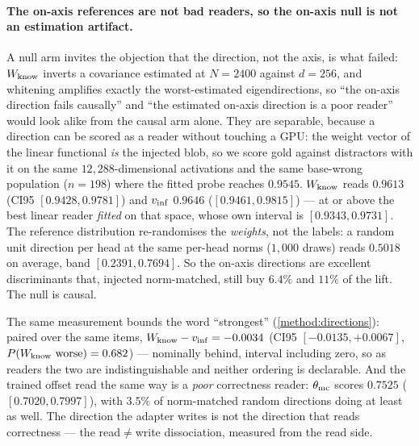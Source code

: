 \paragraph{The on-axis references are not bad readers, so the on-axis null is not an
estimation artifact.}
A null arm invites the objection that the direction, not the axis, is what failed:
$W_{\mathrm{know}}$ inverts a covariance estimated at $N{=}2400$ against $d{=}256$, and whitening
amplifies exactly the worst-estimated eigendirections, so ``the on-axis direction
fails causally'' and ``the estimated on-axis direction is a poor reader'' would look
alike from the causal arm alone. They are separable, because a direction can be
scored as a reader without touching a GPU: the weight vector of the linear functional
\emph{is} the injected blob, so we score gold against distractors with it on the same
$12{,}288$-dimensional activations and the same base-wrong population ($n{=}198$)
where the fitted probe reaches $0.9545$. $W_{\mathrm{know}}$ reads $\mathbf{0.9613}$ (CI95
$[0.9428, 0.9781]$) and $v_{\mathrm{inf}}$ $0.9646$ ($[0.9461, 0.9815]$) --- at or above the
best linear reader \emph{fitted} on that space, whose own interval is
$[0.9343, 0.9731]$. The reference distribution re-randomises the \emph{weights},
not the labels: a random unit direction per head at the same per-head norms
($1{,}000$ draws) reads $0.5018$ on average, band $[0.2391, 0.7694]$. So the on-axis
directions are excellent discriminants that, injected norm-matched, still buy
$6.4\%$ and $11\%$ of the lift. The null is causal.

The same measurement bounds the word ``strongest'' (\cref{method:directions}):
paired over the same items, $W_{\mathrm{know}} - v_{\mathrm{inf}} = -0.0034$ (CI95 $[-0.0135, +0.0067]$,
$P(W_{\mathrm{know}}\ \text{worse}) = 0.682$) --- nominally behind, interval including zero, so
as readers the two are indistinguishable and neither ordering is declarable. And the
trained offset read the same way is a \emph{poor} correctness reader: $\theta_{\mathrm{mc}}$
scores $0.7525$ ($[0.7020, 0.7997]$), with $3.5\%$ of norm-matched random directions
doing at least as well. The direction the adapter writes is not the direction that
reads correctness --- the read${\neq}$write dissociation, measured from the read
side.

